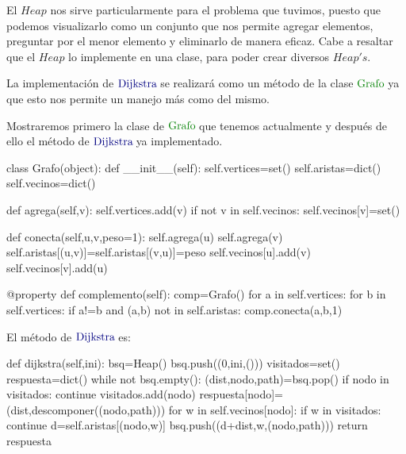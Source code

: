 \documentclass[12pt,a4paper]{article}
\newcommand{\dijkstra}{$\textcolor{deepblue}{\mathrm{Dijkstra}}\>$}
\newcommand{\grafo}{$\textcolor{deepgreen}{\mathrm{Grafo}}\>$}
\begin{document}
El $Heap$ nos sirve particularmente para el problema que tuvimos, puesto que podemos visualizarlo como un conjunto que nos permite agregar elementos, preguntar por el menor elemento y eliminarlo de manera eficaz. Cabe a resaltar que el $Heap$ lo implemente en una clase, para poder crear diversos $Heap's$.

La implementaci\'on de \dijkstra se realizar\'a como un m\'etodo de la clase \grafo ya que esto nos permite un manejo m\'as como del mismo.

Mostraremos primero la clase de \grafo que tenemos actualmente y despu\'es de ello el m\'etodo de \dijkstra ya implementado.

\begin{python}
class Grafo(object):
    def __init__(self):
        self.vertices=set()
        self.aristas=dict()
        self.vecinos=dict()
        
    def agrega(self,v):
        self.vertices.add(v)
        if not v in self.vecinos:
            self.vecinos[v]=set()
            
    def conecta(self,u,v,peso=1):
        self.agrega(u)
        self.agrega(v)
        self.aristas[(u,v)]=self.aristas[(v,u)]=peso
        self.vecinos[u].add(v)
        self.vecinos[v].add(u)
        
    @property
    def complemento(self):
        comp=Grafo()
        for a in self.vertices:
            for b in self.vertices:
                if a!=b and (a,b) not in self.aristas:
                    comp.conecta(a,b,1)


\end{python}
\newpage
El m\'etodo de \dijkstra es:
\begin{python}
  def dijkstra(self,ini):
        bsq=Heap()
        bsq.push((0,ini,()))
        visitados=set()
        respuesta=dict()
        while not bsq.empty():
            (dist,nodo,path)=bsq.pop()
            if nodo in visitados:
                continue
            visitados.add(nodo)
            respuesta[nodo]=(dist,descomponer((nodo,path)))
            for w in self.vecinos[nodo]:
                if w in visitados:
                    continue
                d=self.aristas[(nodo,w)]
                bsq.push((d+dist,w,(nodo,path)))
        return respuesta
\end{python}
\end{document}
